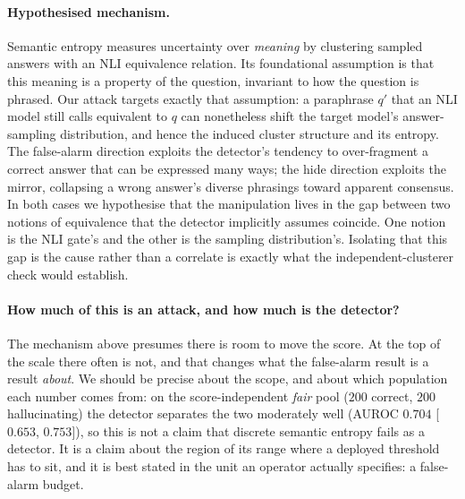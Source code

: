 \label{sec:discussion}

\paragraph{Hypothesised mechanism.}
Semantic entropy measures uncertainty over \emph{meaning} by clustering sampled
answers with an NLI equivalence relation. Its foundational assumption is that this
meaning is a property of the question, invariant to how the question is phrased. Our
attack targets exactly that assumption: a paraphrase $q'$ that an NLI model still
calls equivalent to $q$ can nonetheless shift the target model's answer-sampling
distribution, and hence the induced cluster structure and its entropy. The
false-alarm direction exploits the detector's tendency to over-fragment a correct
answer that can be expressed many ways; the hide direction exploits the mirror,
collapsing a wrong answer's diverse phrasings toward apparent consensus. In both
cases we hypothesise that the manipulation lives in the gap between two notions of
equivalence that the detector implicitly assumes coincide. One notion is the NLI gate's and
the other is the sampling distribution's. Isolating that this gap is the cause rather than a
correlate is exactly what the independent-clusterer check would establish.

\paragraph{How much of this is an attack, and how much is the detector?}
The mechanism above presumes there is room to move the score. At the top of the scale there
often is not, and that changes what the false-alarm result is a result \emph{about}. We
should be precise about the scope, and about which population each number comes from: on the
score-independent \emph{fair} pool ($200$ correct, $200$ hallucinating) the detector
separates the two moderately well (AUROC $0.704$ [$0.653$, $0.753$]), so this is not a claim
that discrete semantic entropy fails as a detector. It is a claim about the region of its
range where a deployed threshold has to sit, and it is best stated in the unit an operator
actually specifies: a false-alarm budget.

